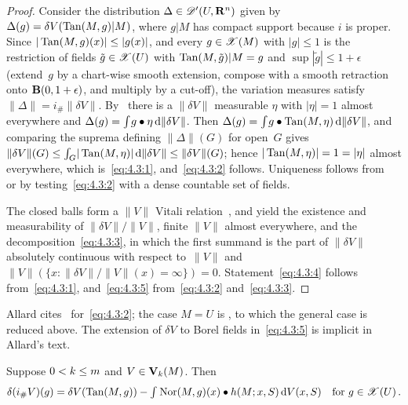 \begin{proof}
    Consider the distribution $\Delta \in \mathscr{D}'(U,\mathbf{R}^{n})$ given by $\Delta(g) = \delta V(\operatorname{Tan}(M,g)|M)$, where $g|M$ has compact support because $i$ is proper. Since $|\operatorname{Tan}(M,g)(x)| \le |g(x)|$, and every $g \in \mathscr{X}(M)$ with $|g| \le 1$ is the restriction of fields $\tilde g \in \mathscr{X}(U)$ with $\operatorname{Tan}(M,\tilde g)|M = g$ and $\sup|\tilde g| \le 1 + \epsilon$ (extend~$g$ by a chart-wise smooth extension, compose with a smooth retraction onto $\mathbf{B}(0,1+\epsilon)$, and multiply by a cut-off), the variation measures satisfy $\|\Delta\| = i_\# \|\delta V\|$. By~\cite[4.1.5]{Federer1969} there is a $\|\delta V\|$ measurable $\eta$ with $|\eta| = 1$ almost everywhere and $\Delta(g) = {\textstyle\int_{}^{}} g \bullet \eta \,\mathrm{d} \|\delta V\|$. Then $\Delta(g) = {\textstyle\int_{}^{}} g \bullet \operatorname{Tan}(M,\eta) \,\mathrm{d} \|\delta V\|$, and comparing the suprema defining $\|\Delta\|(G)$ for open~$G$ gives $\|\delta V\|(G) \le {\textstyle\int_{G}^{}} |\operatorname{Tan}(M,\eta)| \,\mathrm{d} \|\delta V\| \le \|\delta V\|(G)$; hence $|\operatorname{Tan}(M,\eta)| = 1 = |\eta|$ almost everywhere, which is~\eqref{eq:4.3:1}, and~\eqref{eq:4.3:2} follows. Uniqueness follows from~\cite[2.5.12]{Federer1969} or by testing~\eqref{eq:4.3:2} with a dense countable set of fields.

    The closed balls form a $\|V\|$ Vitali relation~\cite[2.8.18]{Federer1969}, and
    \cite[2.9.2, 2.9.5, 2.9.7, 2.9.10]{Federer1969} yield the existence and measurability of $\|\delta V\| / \|V\|$, finite $\|V\|$ almost everywhere, and the decomposition~\eqref{eq:4.3:3}, in which the first summand is the part of $\|\delta V\|$ absolutely continuous with respect to~$\|V\|$ and $\|V\|(\{ x : \|\delta V\| / \|V\|(x) = \infty \}) = 0$. Statement~\eqref{eq:4.3:4} follows from~\eqref{eq:4.3:1}, and~\eqref{eq:4.3:5} from~\eqref{eq:4.3:2} and~\eqref{eq:4.3:3}.
\end{proof}

\begin{remark}
    \label{rem:4.3}
    Allard cites~\cite[2.5.12]{Federer1969} for~\eqref{eq:4.3:2}; the case $M = U$ is
    \cite[4.1.5]{Federer1969}, to which the general case is reduced above. The extension of
    $\delta V$ to Borel fields in~\eqref{eq:4.3:5} is implicit in Allard's text.
\end{remark}

\begin{lemma}
    \label{al:4.4}
    Suppose $0 < k \le m$ and $V \in \mathbf{V}_{k}(M)$. Then
    \begin{displaymath}
        \delta(i_\# V)(g) = \delta V(\operatorname{Tan}(M,g)) - {\textstyle\int_{}^{}} \operatorname{Nor}(M,g)(x) \bullet h(M;x,S) \,\mathrm{d}
        V(x,S) \quad \text{for $g \in \mathscr{X}(U)$} \,.
    \end{displaymath}
\end{lemma}

